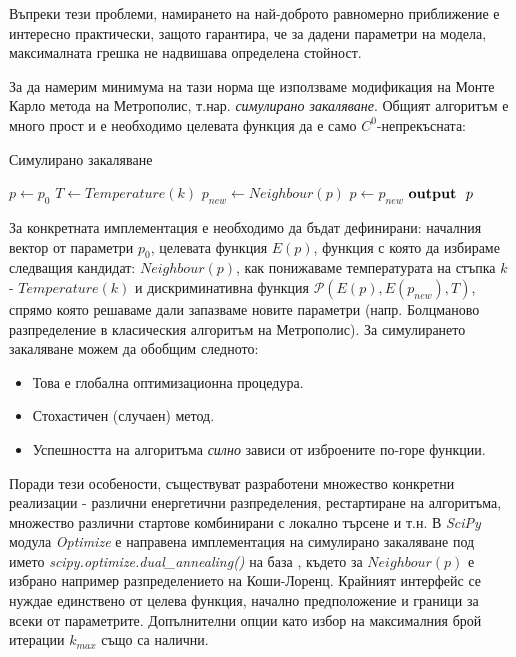 Въпреки тези проблеми, намирането на най-доброто равномерно приближение е интересно практически, защото гарантира, че за дадени параметри на модела, максималната грешка не надвишава определена стойност.

За да намерим минимума на тази норма ще използваме модификация на Монте Карло метода на Метрополис, т.нар. \textit{симулирано закаляване}. Общият алгоритъм е много прост \cite{wiki:Simulated_annealing} и е необходимо целевата функция да е само $C^0$-непрекъсната:
\begin{algorithm}
\caption{Симулирано закаляване}\label{alg:cap}
    \begin{algorithmic}[1]
    \State $p \gets p_0$ 
     
        \State $T \gets Temperature (k)$
        \State $p_{new} \gets Neighbour(p)$
            \State $p \gets p_{new}$
        \EndIf
    \EndWhile
    \State $ \text{\textbf{output}}~~p$
    \end{algorithmic}
\end{algorithm}

За конкретната имплементация е необходимо да бъдат дефинирани: началния вектор от параметри $p_0$, целевата функция $E(p
)$, функция с която да избираме следващия кандидат: $Neighbour(p)$, как понижаваме температурата на стъпка $k$ - $Temperature (k)$ и дискриминативна функция $\mathcal{P}\left(E(p), E(p_{new}), T\right)$, спрямо която решаваме дали запазваме новите параметри (напр. Болцманово разпределение в класическия алгоритъм на Метрополис). За симулирането закаляване можем да обобщим следното:
\begin{itemize}
    \item Това е глобална оптимизационна процедура.
    \item Стохастичен (случаен) метод.
    \item Успешността на алгоритъма \textit{силно} зависи от изброените по-горе функции.
\end{itemize}
Поради тези особености, съществуват разработени множество конкретни реализации - различни енергетични разпределения, рестартиране на алгоритъма, множество различни стартове комбинирани с локално търсене и т.н.  \cite{Xiang1997} \cite{Xiang2013}
В \textit{SciPy} модула \textit{Optimize} е направена имплементация на симулирано закаляване под името \textit{scipy.optimize.dual_annealing()} на база \cite{Xiang2013}, където за $Neighbour(p)$ е избрано например разпределението на Коши-Лоренц. Крайният интерфейс се нуждае единствено от целева функция, начално предположение и граници за всеки от параметрите. Допълнителни опции като избор на максималния брой итерации $k_{max}$ също са налични.

